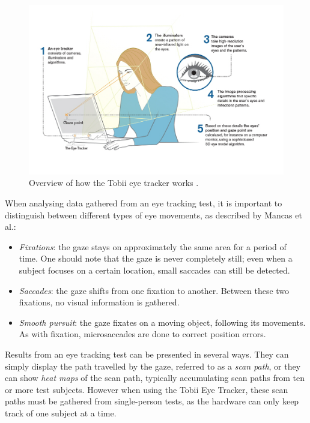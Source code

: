 \begin{figure}[h!]
	\centering
	\includegraphics[width=\textwidth]{figures/tobii.jpg}
	\caption{Overview of how the Tobii eye tracker works \cite{TobiiPro}.\label{fig:tobii}}
\end{figure}

When analysing data gathered from an eye tracking test, it is important to distinguish between different types of eye movements, as described by Mancas et al.:

\begin{itemize}
\item \textit{Fixations}: the gaze stays on approximately the same area for a period of time. One should note that the gaze is never completely still; even when a subject focuses on a certain location, small saccades can still be detected.
\item \textit{Saccades}: the gaze shifts from one fixation to another. Between these two fixations, no visual information is gathered.
\item \textit{Smooth pursuit}: the gaze fixates on a moving object, following its movements. As with fixation, microsaccades are done to correct position errors.
\end{itemize}

Results from an eye tracking test can be presented in several ways. They can simply display the path travelled by the gaze, referred to as a \textit{scan path}, or they can show \textit{heat maps} of the scan path, typically accumulating scan paths from ten or more test subjects. However when using the Tobii Eye Tracker, these scan paths must be gathered from single-person tests, as the hardware can only keep track of one subject at a time.

